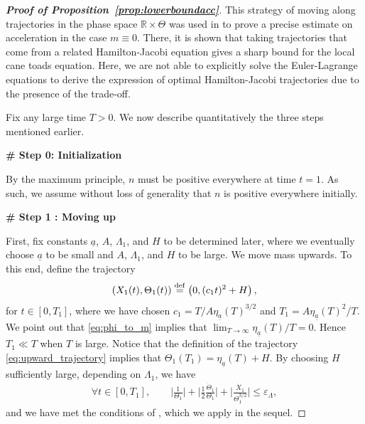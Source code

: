 \documentclass[11pt]{article}    %
\newcommand{\R}{\mathbb{R}}
\renewcommand{\epsilon}{\varepsilon}
\begin{document}
\begin{proof}[{\bf Proof of Proposition~\ref{prop:lowerboundacc}}]
This strategy of moving along trajectories in the phase space $\R\times\Theta$ was used in \cite{BHR_Acceleration} to prove a precise estimate on acceleration in the case $m\equiv 0$. There, it is shown that taking trajectories that come from a related Hamilton-Jacobi equation gives a sharp bound for the local cane toads equation. Here, we are not able to explicitly solve the Euler-Lagrange equations to derive the expression of optimal Hamilton-Jacobi trajectories due to the presence of the trade-off.

Fix any large time $T>0$.  We now describe quantitatively the three steps mentioned earlier.

\smallskip

{\bf \# Step 0: Initialization}

\smallskip

By the maximum principle, $n$ must be positive everywhere at time $t=1$.  As such, we assume without loss of generality that $n$ is positive everywhere initially.

\smallskip

{\bf \# Step 1 : Moving up}

\smallskip

First, fix constants $\underline a$, $A$, $\Lambda_1$, and $H$ to be determined later, where we eventually choose $\underline{a}$ to be small and $A$, $\Lambda_1$, and $H$ to be large.  We move mass upwards.  To this end, define the trajectory 
\begin{equation}\label{eq:upward_trajectory}
	\left(X_1(t),\Theta_1(t)\right) \stackrel{\rm def}{=} \left( 0 ,  (c_1 t)^2 + H\right),
\end{equation}
for $t\in[0,T_1]$, where we have chosen $c_1 = T/A\eta_{\underline a}(T)^{3/2}$ and $T_1 = A \eta_{\underline a}(T)^2 / T$.
We point out that \eqref{eq:phi_to_m} implies that $\lim_{T \to \infty}\eta_{\underline a}(T)/T =0$. Hence $T_1 \ll T$ when $T$ is large.  Notice that the definition of the trajectory \eqref{eq:upward_trajectory} implies that $\Theta_1(T_1) = \eta_{\underline a}(T) + H$.  By choosing $H$ sufficiently large, depending on $\Lambda_1$, we have 
\begin{equation}
\begin{split}
\forall t\in [0,T_1], \qquad	\Big|\frac{1}{\Theta_{1}}\Big|  +  \Big|\frac{1}{2} \frac{\dot\Theta_{1}}{\Theta_{1}}\Big| + \Big|\frac{\dot X_{1}}{\Theta_{1}^{3/2}}\Big| \leq \epsilon_\Lambda,
\end{split}
\end{equation}
and we have met the conditions of , which we apply in the sequel.  


\end{proof}
\end{document}
